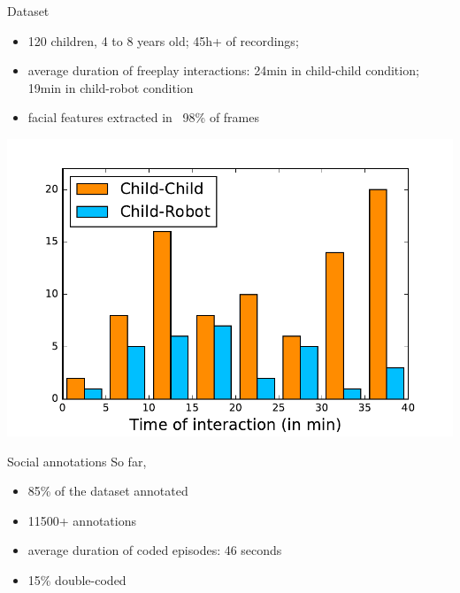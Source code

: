 \documentclass[compress]{beamer}
\begin{document}

\begin{frame}{Dataset}
    \begin{itemize}
        \item 120 children, 4 to 8 years old; 45h+ of recordings;
     \item average duration of freeplay interactions: 24min in child-child
         condition; 19min in child-robot condition
     \item facial features extracted in ~98\% of frames
    \end{itemize}

    \begin{center}
        \includegraphics[width=0.5\linewidth]{freeplay/durations}
    \end{center}
\end{frame}





\begin{frame}{Social annotations}
    So far,
    \begin{itemize}
        \item 85\% of the dataset annotated
        \item 11500+ annotations
        \item average duration of coded episodes: 46 seconds
        \item 15\% double-coded
    \end{itemize}
\end{frame}


\end{document}
